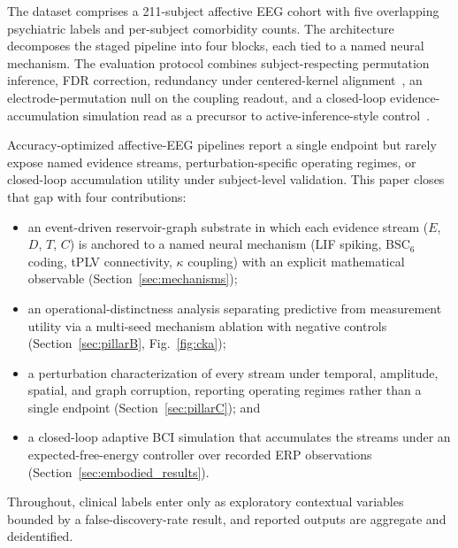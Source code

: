 \documentclass[journal]{IEEEtran}
\begin{document}
The dataset comprises a 211-subject affective EEG cohort with five overlapping psychiatric labels and per-subject comorbidity counts. The architecture decomposes the staged pipeline into four blocks, each tied to a named neural mechanism. The evaluation protocol combines subject-respecting permutation inference, FDR correction, redundancy under centered-kernel alignment~\cite{kornblith2019similarity}, an electrode-permutation null on the coupling readout, and a closed-loop evidence-accumulation simulation read as a precursor to active-inference-style control~\cite{friston2010free,parr2022activeinference,pezzulo2015active}.

Accuracy-optimized affective-EEG pipelines report a single endpoint but rarely expose named evidence streams, perturbation-specific operating regimes, or closed-loop accumulation utility under subject-level validation. This paper closes that gap with four contributions:
\begin{itemize}\setlength{\itemsep}{-1pt}
\item an event-driven reservoir-graph substrate in which each evidence stream ($E$, $D$, $T$, $C$) is anchored to a named neural mechanism (LIF spiking, BSC$_6$ coding, tPLV connectivity, $\kappa$ coupling) with an explicit mathematical observable (Section~\ref{sec:mechanisms});
\item an operational-distinctness analysis separating predictive from measurement utility via a multi-seed mechanism ablation with negative controls (Section~\ref{sec:pillarB}, Fig.~\ref{fig:cka});
\item a perturbation characterization of every stream under temporal, amplitude, spatial, and graph corruption, reporting operating regimes rather than a single endpoint (Section~\ref{sec:pillarC}); and
\item a closed-loop adaptive BCI simulation that accumulates the streams under an expected-free-energy controller over recorded ERP observations (Section~\ref{sec:embodied_results}).
\end{itemize}
Throughout, clinical labels enter only as exploratory contextual variables bounded by a false-discovery-rate result, and reported outputs are aggregate and deidentified.
\end{document}
